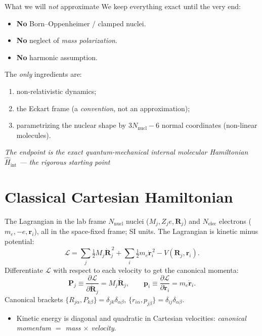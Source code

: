\documentclass[aspectratio=169,10pt]{beamer}
\newcommand{\stagenum}{0}
\newcommand{\setstage}[1]{\renewcommand{\stagenum}{#1}}
\begin{document}
\begin{frame}{What we will \emph{not} approximate}
\setstage{0}
We keep everything exact until the very end:
\begin{itemize}
  \item \textbf{No} Born--Oppenheimer / clamped nuclei.
  \item \textbf{No} neglect of \emph{mass polarization}.
  \item \textbf{No} harmonic assumption.
\end{itemize}
\pause
The \emph{only} ingredients are:
\begin{enumerate}
  \item non-relativistic dynamics;
  \item the Eckart frame (a \emph{convention}, not an approximation);
  \item parametrizing the nuclear shape by $3N_{\mathrm{nucl}}-6$ normal coordinates (non-linear molecules).
\end{enumerate}
\vspace{0.5ex}
\centering\itshape The endpoint is the exact quantum-mechanical internal molecular Hamiltonian $\hat H_{\mathrm{int}}$ — the rigorous starting point
\end{frame}

\setstage{1}
\section{Classical Cartesian Hamiltonian}

\begin{frame}{The Lagrangian in the lab frame}
\setstage{1}
$N_{\mathrm{nucl}}$ nuclei ($M_j,Z_je,\mathbf R_j$) and $N_{\mathrm{elec}}$ electrons ($m_e,-e,\mathbf r_i$), all in the space-fixed frame; SI units. The Lagrangian is kinetic minus potential:
\begin{equation*}
\mathcal L = \sum_j\tfrac12 M_j\dot{\mathbf R}_j^{\,2} + \sum_i\tfrac12 m_e\dot{\mathbf r}_i^{\,2} - V(\mathbf R_j,\mathbf r_i).
\end{equation*}
Differentiate $\mathcal L$ with respect to each velocity to get the \alert{canonical momenta}:
\begin{equation*}
\boxed{\;\mathbf{P}_j \equiv \frac{\partial \mathcal L}{\partial\dot{\mathbf R}_j} = M_j\dot{\mathbf R}_j,
\qquad
\mathbf{p}_i \equiv \frac{\partial \mathcal L}{\partial\dot{\mathbf r}_i} = m_e\dot{\mathbf r}_i.\;}
\end{equation*}
Canonical brackets $\{R_{j\alpha},P_{k\beta}\}=\delta_{jk}\delta_{\alpha\beta}$, $\{r_{i\alpha},p_{j\beta}\}=\delta_{ij}\delta_{\alpha\beta}$.
\begin{itemize}
  \item Kinetic energy is diagonal and quadratic in Cartesian velocities: \emph{canonical momentum $=$ mass $\times$ velocity}.
\end{itemize}
\end{frame}
\end{document}
